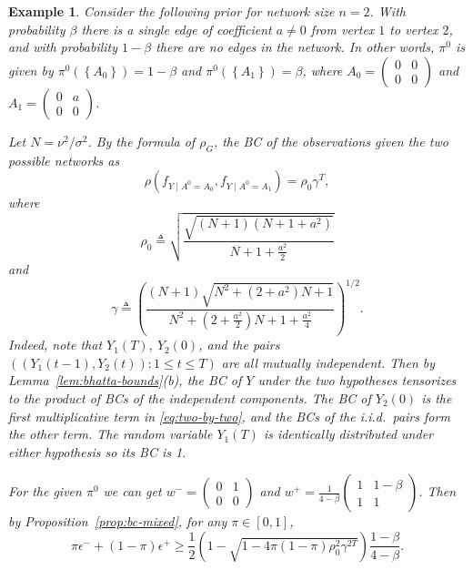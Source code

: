 \documentclass[conference,letterpaper]{IEEEtran}
\newcommand{\defeq}{\triangleq}
\newcommand{\ind}[2]{\left(#1\colon #2\right)} %
\newtheorem{exam}{Example}
\newcommand{\trueAdjMat}{A^0}%
\newcommand{\sigmat}{\nu}%
\newcommand{\sigmab}{\sigma}%
\newcommand{\fnrNet}{\epsilon^-}%
\newcommand{\fprNet}{\epsilon^+}%
\newcommand{\edgeCoeff}{a}%
\newcommand{\nsr}{N}%
\begin{document}
\begin{exam}
  Consider the following prior for network size $n = 2$.  With
  probability $\beta$ there is a single edge of coefficient
  $\edgeCoeff\neq 0$ from vertex $1$ to vertex $2$, and with
  probability $1-\beta$ there are no edges in the network.  In other
  words, $\pi^0$ is given by
  $\pi^0\left(\left\{A_0\right\}\right) = 1-\beta$ and
  $\pi^0\left(\left\{A_1\right\}\right) = \beta$, where
  $A_0 = \begin{pmatrix} 0 & 0\\0 & 0
  \end{pmatrix}$ and $A_1 = \begin{pmatrix}
    0 & \edgeCoeff\\0 & 0
  \end{pmatrix}$.

  Let $\nsr = \sigmat^2 / \sigmab^2$.  By the formula of $\rho_G$, the
  BC of the observations given the two possible networks as
  \begin{equation}
    \label{eq:two-by-two}
    \rho(f_{Y\mid \trueAdjMat = A_0}, f_{Y\mid \trueAdjMat = A_1}) =
    \rho_0\gamma^T,
  \end{equation}
  where
  \[\rho_0 \defeq \sqrt{\frac{\sqrt{(\nsr + 1)(\nsr + 1 +
          \edgeCoeff^2)}}{\nsr + 1 + \frac{\edgeCoeff^2}2}}\]
  and
  \[\gamma \defeq \left(\frac{(\nsr+1)\sqrt{\nsr^2 +
          (2+\edgeCoeff^2)\nsr + 1}}{\nsr^2 + (2+\frac{\edgeCoeff^2}2)\nsr + 1 +
        \frac{\edgeCoeff^2}4}\right)^{1/2}.\]
  Indeed, note that $Y_1(T)$, $Y_2(0)$, and the pairs
  $\ind{(Y_1(t-1), Y_2(t))}{1\le t\le T}$ are all mutually
  independent.  Then by Lemma~\ref{lem:bhatta-bounds}(b), the BC of
  $Y$ under the two hypotheses tensorizes to the product of BCs of the
  independent components.  The BC of $Y_2(0)$ is the first
  multiplicative term in \eqref{eq:two-by-two}, and the BCs of the
  i.i.d.\ pairs form the other term.  The random variable $Y_1(T)$ is
  identically distributed under either hypothesis so its BC is 1.

  For the given $\pi^0$ we can get $w^- =
  \begin{pmatrix}
    0 & 1\\0 & 0
  \end{pmatrix}$ and $w^+ =
  \displaystyle\frac 1{4-\beta}\begin{pmatrix}
    1 & 1-\beta\\1 & 1
  \end{pmatrix}$.  Then by Proposition~\ref{prop:bc-mixed}, for any $\pi\in[0, 1]$,
  \[\pi\fnrNet + (1-\pi)\fprNet \ge \frac 12\left(1 - \sqrt{1 -
        4\pi(1-\pi)\rho_0^2\gamma^{2T}}\right)\frac{1 - \beta}{4 - \beta}.\]
\end{exam}
\end{document}
